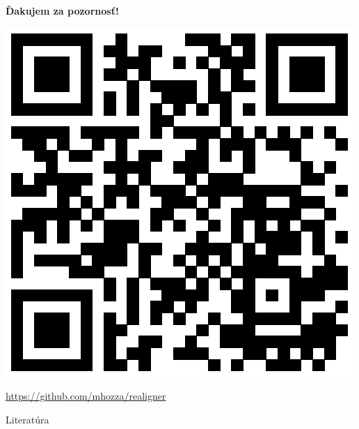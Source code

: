\documentclass[xcolor=dvipsnames, compress, 12pt]{beamer}
\theoremstyle{definition}
\begin{document}
\begin{frame}[plain, c]
  \transdissolve[duration=5]
  \begin{center}
  \textbf{\color{Green} \LARGE Ďakujem za pozornosť!}

  \includegraphics[width=.30\textwidth]{images/realigner}

  \url{https://github.com/mhozza/realigner}
  \end{center}


\end{frame}

\begin{frame}[allowframebreaks]{Literatúra}
  
  
\end{frame}
\end{document}
